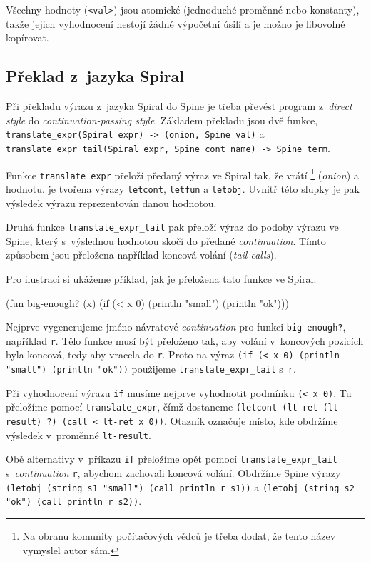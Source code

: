Všechny hodnoty (\texttt{<val>}) jsou atomické (jednoduché proměnné nebo
konstanty), takže jejich vyhodnocení nestojí žádné výpočetní úsilí a je možno je
libovolně kopírovat.

\subsection{Překlad z~jazyka Spiral}

Při překladu výrazu z~jazyka Spiral do Spine je třeba převést program
z~\emph{direct style} do \emph{continuation-passing style}. Základem překladu
jsou dvě funkce, \texttt{translate_expr(Spiral expr) -> (onion, Spine val)} a
\texttt{translate_expr_tail(Spiral expr, Spine cont name) -> Spine term}.

Funkce \texttt{translate_expr} přeloží předaný výraz ve Spiral tak, že vrátí
\footnote{Na obranu komunity počítačových vědců je třeba dodat, že
tento název vymyslel autor sám.} (\emph{onion}) a hodnotu.  je
tvořena výrazy \texttt{letcont}, \texttt{letfun} a \texttt{letobj}. Uvnitř této
slupky je pak výsledek výrazu reprezentován danou hodnotou.

Druhá funkce \texttt{translate_expr_tail} pak přeloží výraz do podoby výrazu ve
Spine, který s~výslednou hodnotou skočí do předané \emph{continuation}. Tímto
způsobem jsou přeložena například koncová volání (\emph{tail-calls}).

Pro ilustraci si ukážeme příklad, jak je přeložena tato funkce ve Spiral:

\begin{spiral}
(fun big-enough? (x)
  (if (< x 0)
    (println "small")
    (println "ok")))
\end{spiral}

Nejprve vygenerujeme jméno návratové \emph{continuation} pro funkci
\texttt{big-enough?}, například \texttt{r}. Tělo funkce musí být přeloženo tak,
aby volání v~koncových pozicích byla koncová, tedy aby vracela do \texttt{r}.
Proto na výraz \texttt{(if (< x 0) (println "small") (println "ok"))} použijeme
\texttt{translate_expr_tail} s~\texttt{r}.

Při vyhodnocení výrazu \texttt{if} musíme nejprve vyhodnotit podmínku \texttt{(<
x 0)}. Tu přeložíme pomocí \texttt{translate_expr}, čímž dostaneme 
\texttt{(letcont (lt-ret (lt-result) ?) (call < lt-ret x 0))}. Otazník označuje
místo, kde obdržíme výsledek v~proměnné \texttt{lt-result}.

Obě alternativy v~příkazu \texttt{if} přeložíme opět pomocí
\texttt{translate_expr_tail} s~\emph{continuation} \texttt{r}, abychom zachovali
koncová volání. Obdržíme Spine výrazy \texttt{(letobj (string s1 "small") (call
println r s1))} a \texttt{(letobj (string s2 "ok") (call println r s2))}.

